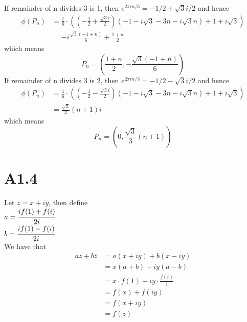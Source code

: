 \documentclass[11pt]{article}
\begin{document}
If remainder of n divides 3 is 1, then $e^{2\pi in/3} = -1/2 + \sqrt{3}i/2$ and hence
\begin{equation*}
    \begin{aligned}
        \phi(P_n) &= \frac{1}{6} \cdot \left(\left(-\frac{1}{2} + \frac{\sqrt{3}i}{2} \right)(-1 - i\sqrt{3} - 3 n - i\sqrt{3} n )+ 1 + i\sqrt{3}\right) \\
        &= -i \frac{\sqrt{3} (-1 + n)}{6} +  \frac{1 + n}{2}
    \end{aligned}
\end{equation*}
which means 
\[
    P_n = \left(   \frac{1 + n}{2} , - \frac{\sqrt{3} (-1 + n)}{6}\right)
\]
If remainder of n divides 3 is 2, then $e^{2\pi in/3} = -1/2 - \sqrt{3}i/2$ and hence
\begin{equation*}
    \begin{aligned}
        \phi(P_n) &= \frac{1}{6} \cdot \left(\left(-\frac{1}{2} - \frac{\sqrt{3}i}{2} \right)(-1 - i\sqrt{3} - 3 n - i\sqrt{3} n )+ 1 + i\sqrt{3}\right) \\
        &= \frac{\sqrt{3}}{3}(n+1)i 
    \end{aligned}
\end{equation*}
which means 
\[
    P_n = \left(0, \frac{\sqrt{3}}{3}(n+1) \right)
\]
\newpage
\section*{A1.4}
Let $z=x+iy$, then define \\
$a = \cfrac{if(1) + f(i)}{2i}$ \\
$b = \cfrac{if(1) - f(i)}{2i}$ \\
We have that 
\begin{equation*}
    \begin{aligned}
        az + b\overline{z} &= a(x+iy) + b(x-iy) \\
        &= x(a+b) + iy(a-b) \\
        &= x \cdot f(1) + iy \cdot \frac{f(i)}{i} \\
        &= f(x) + f(iy) \\
        &= f(x+iy) \\
        &= f(z)
    \end{aligned}
\end{equation*}
\newpage
\end{document}

